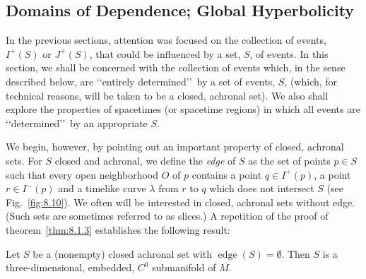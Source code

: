 


\subsection{Domains of Dependence; Global Hyperbolicity}\label{sec:8.3}
\setcounter{theorem}{0}

In the previous sections, attention was focused on the collection of events, \(I^+(S)\)
or \(J^+(S)\), that could be influenced by a set, \(S\), of events. In this section, we
shall be concerned with the collection of events which, in the sense described below,
are \lq\lq entirely determined\rq\rq\ by a set of events, \(S\), (which, for technical
reasons, will be taken to be a closed, achronal set). We also shall explore the
properties of spacetimes (or spacetime regions) in which all events are
\lq\lq determined\rq\rq\ by an appropriate \(S\).

We begin, however, by pointing out an important property of closed, achronal sets.
For \(S\) closed and achronal, we define the \emph{edge} of \(S\) as the set of points
\(p\in S\) such that every open neighborhood \(O\) of \(p\) contains a point
\(q\in I^+(p)\), a point \(r\in I^-(p)\) and a timelike curve \(\lambda\) from \(r\)
to \(q\) which does not intersect \(S\) (see Fig.~\ref{fig:8.10}). We often will be
interested in closed, achronal sets without edge. (Such sets are sometimes referred
to as slices.) A repetition of the proof of theorem~\ref{thm:8.1.3} establishes the
following result:

\begin{theorem}\label{thm:8.3.1}
Let \(S\) be a (nonempty) closed achronal set with
\(\operatorname{edge}(S)=\emptyset\). Then \(S\) is a three-dimensional, embedded,
\(C^0\) submanifold of \(M\).
\end{theorem}

